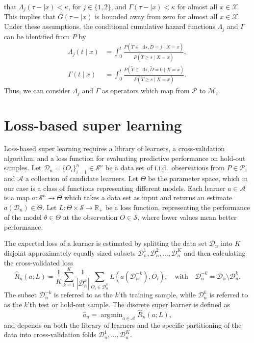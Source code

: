 \documentclass[a4paper,danish]{article}
\newcommand{\R}{\mathbb{R}}
\newcommand*\diff{\mathop{}\!\mathrm{d}}
\newcommand{\1}{\mathds{1}}
\DeclareMathOperator*{\argmin}{\arg\!\min}
\newcommand{\data}{\ensuremath{\mathcal{D}}}
\newcommand{\sample}{\ensuremath{\mathcal{S}}}
\theoremstyle{plain} %
\numberwithin{theorem}{section}
\theoremstyle{definition} %
\theoremstyle{remark}
\begin{document}
that \(\Lambda_{j}(\tau- \mid x)<\kappa \), for \(j\in\{1,2\}\), and
\(\Gamma(\tau- \mid x)<\kappa\) for almost all \(x\in\mathcal
X\). This implies that \(G(\tau- \mid x)\) is bounded away
from zero for almost all \(x\in\mathcal X\).  Under these assumptions,
the conditional cumulative hazard functions \(\Lambda_{j}\) and
\(\Gamma\) can be identified from \(P\) by
\begin{align}
  \Lambda_{j}(t \mid x) &= \int_0^t\frac{  P(\tilde T \in \diff s, \tilde D=j \mid X=x )}{P(\tilde T \geq s \mid X=x )}, \label{eq:lambdaj}\\
  \Gamma(t \mid x) &= \int_0^t\frac{  P(\tilde T \in \diff s, \tilde D=0 \mid X=x )}{P(\tilde T \geq s \mid X=x )}\label{eq:gamma}.
\end{align}
Thus, we can consider $\Lambda_j$ and \(\Gamma\) as operators which map from
\( \mathcal{P} \) to \(\mathcal M_{\tau}\).

\section{Loss-based super learning}
\label{sec:super-learning}

Loss-based super learning requires a library of learners, a
cross-validation algorithm, and a loss function for evaluating
predictive performance on hold-out samples. Let \(
\data_n=\{O_i\}_{i=1}^n \in \sample^n \) be a data set of i.i.d.\
observations from \( P \in \mathcal{P} \), and $\mathcal{A}$ a
collection of candidate learners. Let \(\Theta\) be the parameter
space, which in our case is a class of functions representing
different models. Each learner \(a \in \mathcal{A}\) is a map \( a
\colon \sample^n \rightarrow \Theta \) which takes a data set as
input and returns an estimate $a(\data_n) \in \Theta$. Let \(L\colon
\Theta \times \sample \rightarrow \R_+\) be a loss function,
representing the performance of the model $\theta \in \Theta$ at the
observation \( O \in \sample \), where lower values mean better
performance.

The expected loss of a learner is estimated by splitting the data set
$\data_n$ into $K$ disjoint approximately equally sized subsets
\(\data_n^1, \data_n^2, \dots, \data_n^K \) and then calculating the
cross-validated loss
\begin{equation}
  \label{eq:cv-risk-est}
  \hat{R}_n(a; L) =
  \frac{1}{K}\sum_{k=1}^{K}
  \frac{1}{| \data_n^{k} |}\sum_{O_i \in \data_n^{k}}
  L
  {
    \left(
      a{ (\data_n^{-k})}
      , O_i
    \right)
  },
  \quad \text{with} \quad
  \data_n^{-k} = \data_n \setminus \data_n^{k}.
\end{equation}
The subset \(\data_n^{-k}\) is referred to as the \(k\)'th training
sample, while \(\data_n^{k}\) is referred to as the \(k\)'th test or
hold-out sample.
The discrete super learner is defined as
\begin{equation*}
\hat{a}_n = \argmin_{a\in\mathcal A}\hat{R}_n(a; L),
\end{equation*}
and depends on both the library of learners and the specific
partitioning of the data into cross-validation folds
\( \data_n^1, \dots, \data_n^K \).
\end{document}
